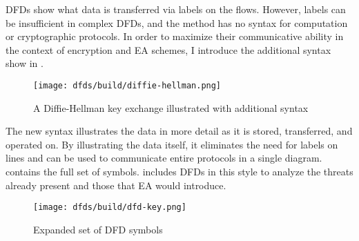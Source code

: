 \Acp{DFD} show what data is transferred via labels on the flows. However, labels can be insufficient in complex
\acp{DFD}, and the method has no syntax for computation or cryptographic protocols. In order to maximize their
communicative ability in the context of encryption and \acl{EA} schemes, I introduce the additional syntax show in
.

\begin{figure}[h]
    \centering\CaptionFontSize
    \texttt{[image: dfds/build/diffie-hellman.png]}
    \caption{A Diffie-Hellman key exchange illustrated with additional syntax}
    \label{fig-dfd-dh-updated}
\end{figure}

The new syntax illustrates the data in more detail as it is stored, transferred, and operated on. By illustrating the
data itself, it eliminates the need for labels on lines and can be used to communicate entire protocols in a single
diagram.  contains the full set of symbols.  includes \acp{DFD} in this
style to analyze the threats already present and those that \ac{EA} would introduce.

\begin{figure}[h]
    \centering\CaptionFontSize
    \texttt{[image: dfds/build/dfd-key.png]}
    \caption{Expanded set of DFD symbols}
    \label{fig-dfd-key}
\end{figure}

